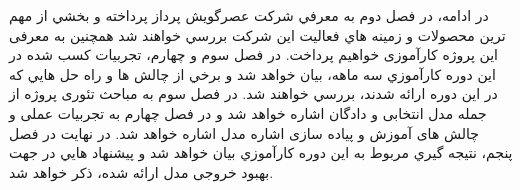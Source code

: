 {در ادامه، در فصل دوم به معرفي شركت عصرگويش پرداز پرداخته و بخشي از مهم ترين محصولات و زمينه هاي فعاليت اين شركت بررسي خواهند شد همچنین به معرفی این پروژه کارآموزی خواهیم پرداخت. در فصل سوم و چهارم، تجربيات كسب شده در اين دوره كارآموزي سه ماهه، بيان خواهد شد و برخي از چالش ها و راه حل هايي كه در اين دوره ارائه شدند، بررسي خواهند شد. در فصل سوم به مباحث تئوری پروژه از جمله مدل انتخابی و دادگان اشاره خواهد شد و در فصل چهارم به تجربیات عملی و چالش های آموزش و پیاده سازی اشاره مدل اشاره خواهد شد. در نهايت در فصل پنجم، نتيجه گيري مربوط به اين دوره كارآموزي بيان خواهد شد و پيشنهاد هايي در جهت بهبود خروجی مدل ارائه شده، ذكر خواهد شد.
}